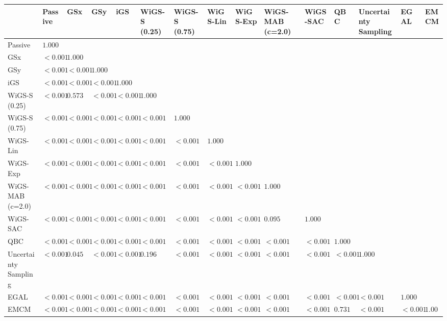 \begin{tabular}{lllllllllllllll}
\toprule
 & Passive & GSx & GSy & iGS & WiGS-S (0.25) & WiGS-S (0.75) & WiGS-Lin & WiGS-Exp & WiGS-MAB (c=2.0) & WiGS-SAC & QBC & Uncertainty Sampling & EGAL & EMCM \\
\midrule
Passive & $1.000$ &  &  &  &  &  &  &  &  &  &  &  &  &  \\
GSx & $<0.001$ & $1.000$ &  &  &  &  &  &  &  &  &  &  &  &  \\
GSy & $<0.001$ & $<0.001$ & $1.000$ &  &  &  &  &  &  &  &  &  &  &  \\
iGS & $<0.001$ & $<0.001$ & $<0.001$ & $1.000$ &  &  &  &  &  &  &  &  &  &  \\
WiGS-S (0.25) & $<0.001$ & $0.573$ & $<0.001$ & $<0.001$ & $1.000$ &  &  &  &  &  &  &  &  &  \\
WiGS-S (0.75) & $<0.001$ & $<0.001$ & $<0.001$ & $<0.001$ & $<0.001$ & $1.000$ &  &  &  &  &  &  &  &  \\
WiGS-Lin & $<0.001$ & $<0.001$ & $<0.001$ & $<0.001$ & $<0.001$ & $<0.001$ & $1.000$ &  &  &  &  &  &  &  \\
WiGS-Exp & $<0.001$ & $<0.001$ & $<0.001$ & $<0.001$ & $<0.001$ & $<0.001$ & $<0.001$ & $1.000$ &  &  &  &  &  &  \\
WiGS-MAB (c=2.0) & $<0.001$ & $<0.001$ & $<0.001$ & $<0.001$ & $<0.001$ & $<0.001$ & $<0.001$ & $<0.001$ & $1.000$ &  &  &  &  &  \\
WiGS-SAC & $<0.001$ & $<0.001$ & $<0.001$ & $<0.001$ & $<0.001$ & $<0.001$ & $<0.001$ & $<0.001$ & $0.095$ & $1.000$ &  &  &  &  \\
QBC & $<0.001$ & $<0.001$ & $<0.001$ & $<0.001$ & $<0.001$ & $<0.001$ & $<0.001$ & $<0.001$ & $<0.001$ & $<0.001$ & $1.000$ &  &  &  \\
Uncertainty Sampling & $<0.001$ & $0.045$ & $<0.001$ & $<0.001$ & $0.196$ & $<0.001$ & $<0.001$ & $<0.001$ & $<0.001$ & $<0.001$ & $<0.001$ & $1.000$ &  &  \\
EGAL & $<0.001$ & $<0.001$ & $<0.001$ & $<0.001$ & $<0.001$ & $<0.001$ & $<0.001$ & $<0.001$ & $<0.001$ & $<0.001$ & $<0.001$ & $<0.001$ & $1.000$ &  \\
EMCM & $<0.001$ & $<0.001$ & $<0.001$ & $<0.001$ & $<0.001$ & $<0.001$ & $<0.001$ & $<0.001$ & $<0.001$ & $<0.001$ & $0.731$ & $<0.001$ & $<0.001$ & $1.000$ \\
\bottomrule
\end{tabular}
